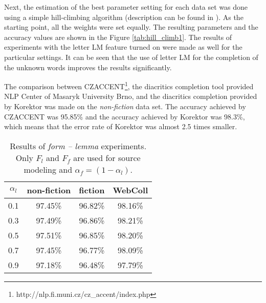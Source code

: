 \documentclass[11pt]{article}
\begin{document}
Next, the estimation of the best parameter setting for each data set was done
using a simple hill-climbing algorithm
(description can be found in \cite{Russell2003}).
As the starting point, all the weights
were set equally. The resulting parameters and the accuracy values are shown in
the Figure \ref{tab:hill_climb1}. The results of experiments with the letter LM
feature turned on were made as well for the particular settings. It can be seen
that the use of letter LM for the completion of the unknown words improves the
results significantly. 

The comparison between CZACCENT\footnote{http://nlp.fi.muni.cz/cz\_accent/index.php},
the diacritics completion tool provided NLP Center of
Masaryk University Brno, and the diacritics completion provided by Korektor was made on the
\emph{non-fiction} data set. The accuracy achieved by CZACCENT was 95.85\% and the accuracy
achieved by Korektor was 98.3\%, which means that the error rate of Korektor was almost 2.5 times
smaller.

\begin{table}
    \begin{center}
    \begin{tabular}{ c || c | c | c }
    $\alpha_l$ & non-fiction & fiction & WebColl\\
    \hline
    0.1 & 97.45\% & 96.82\% & 98.16\%\\
    0.3 & 97.49\% & 96.86\% & 98.21\%\\
    0.5 & 97.51\% & 96.85\% & 98.20\%\\
    0.7 & 97.45\% & 96.77\% & 98.09\%\\
    0.9 & 97.18\% & 96.48\% & 97.79\%\\
    \end{tabular}
    \end{center}
    \caption{Results of \emph{form -- lemma} experiments. Only $F_l$ and $F_f$
    are used for source modeling and $\alpha_f = (1 - \alpha_l)$.}
    \label{tab:diacritic_form_lemma}
\end{table}
\end{document}
